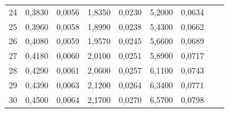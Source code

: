 \documentclass[10pt,a4paper]{article}
\begin{document}
\begin{tabular}{c|c|c|c|c|c|c|c|c}
24	&	0,3830	&	0,0056	&	1,8350	&	0,0230	&	5,2000	&	0,0634	&		&		 \\
25	&	0,3960	&	0,0058	&	1,8990	&	0,0238	&	5,4300	&	0,0662	&		&		 \\
26	&	0,4080	&	0,0059	&	1,9570	&	0,0245	&	5,6600	&	0,0689	&		&		 \\
27	&	0,4180	&	0,0060	&	2,0100	&	0,0251	&	5,8900	&	0,0717	&		&		 \\
28	&	0,4290	&	0,0061	&	2,0600	&	0,0257	&	6,1100	&	0,0743	&		&		 \\
29	&	0,4390	&	0,0063	&	2,1200	&	0,0264	&	6,3400	&	0,0771	&		&		 \\
30	&	0,4500	&	0,0064	&	2,1700	&	0,0270	&	6,5700	&	0,0798	&		&		 \\
\end{tabular}
\end{document}
